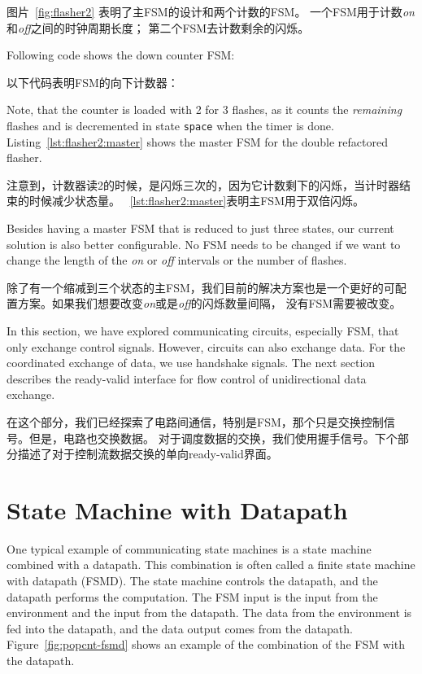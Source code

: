 \documentclass[%
    10pt,
    headinclude, footexclude,
    openright, %
    notitlepage,
    cleardoubleempty,
    headsepline,
    pointlessnumbers,
    bibtotoc, idxtotoc,
    ]{scrbook}
\newcommand{\code}[1]{{\small{\texttt{#1}}}}
\begin{document}
{图片~\ref{fig:flasher2} 表明了主FSM的设计和两个计数的FSM。
一个FSM用于计数\emph{on}和\emph{off}之间的时钟周期长度；
第二个FSM去计数剩余的闪烁。

Following code shows the down counter FSM:

以下代码表明FSM的向下计数器：


\noindent Note, that the counter is loaded with 2 for 3 flashes, as it counts the
\emph{remaining} flashes and is decremented in state \code{space} when the timer
is done. Listing~\ref{lst:flasher2:master} shows the master FSM for the double refactored flasher.

\noindent 注意到，计数器读2的时候，是闪烁三次的，因为它计数剩下的闪烁，当计时器结束的时候减少状态量。
~\ref{lst:flasher2:master}表明主FSM用于双倍闪烁。


Besides having a master FSM that is reduced to just three states, our current solution
is also better configurable. No FSM needs to be changed if we want to change
the length of the \emph{on} or \emph{off} intervals or the number of flashes.

除了有一个缩减到三个状态的主FSM，我们目前的解决方案也是一个更好的可配置方案。如果我们想要改变\emph{on}或是\emph{off}的闪烁数量间隔，
没有FSM需要被改变。

In this section, we have explored communicating circuits, especially FSM, that
only exchange control signals. However, circuits can also exchange data.
For the coordinated exchange of data, we use handshake signals.
The next section describes the ready-valid interface for flow control of
unidirectional data exchange.

在这个部分，我们已经探索了电路间通信，特别是FSM，那个只是交换控制信号。但是，电路也交换数据。
对于调度数据的交换，我们使用握手信号。下个部分描述了对于控制流数据交换的单向ready-valid界面。

\section{State Machine with Datapath}

One typical example of communicating state machines is a state machine
combined with a datapath. This combination is often called a finite state machine
with datapath (FSMD). The state machine controls the datapath, and the datapath
performs the computation. The FSM input is the input from the environment and the input
from the datapath. The data from the environment is fed into the datapath, and the
data output comes from the datapath. Figure~\ref{fig:popcnt-fsmd} shows an example
of the combination of the FSM with the datapath.

}
\end{document}
